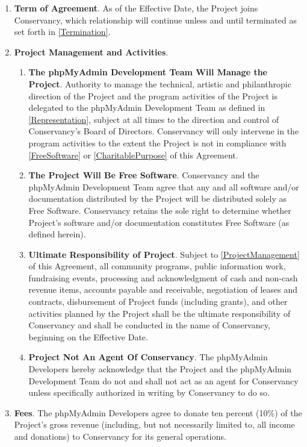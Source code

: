 \documentclass[letterpaper,12pt]{article}
\newcommand{\signatories}{phpMyAdmin Developers\xspace}
\newcommand{\leadershipbody}{phpMyAdmin Development Team\xspace}
\begin{document}
\begin{enumerate}[label=\arabic*.,ref=\S~\arabic*]
\item \textbf{Term of Agreement}. As of the Effective Date, the Project
joins Conservancy, which relationship will continue unless and until
terminated as set forth in \ref{Termination}. 
\item \textbf{Project Management and Activities}.


\begin{enumerate}[label=\alph*.,ref=\theenumi(\alph*)]
\item \textbf{The \leadershipbody Will Manage the Project}. \label{ProjectManagement}
Authority to manage the technical, artistic and philanthropic direction
of the Project and the program activities of the Project is delegated
to the \leadershipbody as defined in \ref{Representation},
subject at all times to the direction and control of Conservancy's
Board of Directors. Conservancy will only intervene in the program
activities to the extent the Project is not in compliance with \ref{FreeSoftware}
or \ref{CharitablePurpose} of this Agreement. 
\item \textbf{The Project Will Be Free Software}. \label{FreeSoftware}
Conservancy and the \leadershipbody agree that any and all software
and/or documentation distributed by the Project will be distributed solely as Free Software.
Conservancy retains the sole right to determine whether Project's
software and/or documentation constitutes Free Software (as defined herein).
\item \textbf{Ultimate Responsibility of Project}. Subject to \ref{ProjectManagement}
of this Agreement, all community programs, public information work,
fundraising events, processing and acknowledgment of cash and non-cash
revenue items, accounts payable and receivable, negotiation of leases
and contracts, disbursement of Project funds (including grants), and
other activities planned by the Project shall be the ultimate responsibility
of Conservancy and shall be conducted in the name of Conservancy,
beginning on the Effective Date. 
\item \textbf{Project Not An Agent Of Conservancy}. The \signatories
hereby acknowledge that the Project and the \leadershipbody
do not and shall not act as an agent for Conservancy unless specifically
authorized in writing by Conservancy to do so. 
\end{enumerate}
\item \textbf{Fees}. The \signatories agree to donate ten percent
(10\%) of the Project's gross revenue (including, but not necessarily limited
to, all income and donations) to Conservancy for its general operations.



\end{enumerate}
\end{document}
